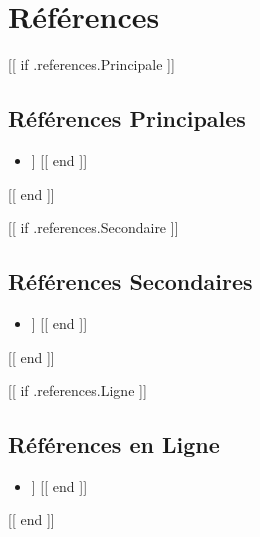 \section{Références}

[[ if .references.Principale ]]
\subsection{Références Principales}
\begin{itemize}
[[ range .references.Principale ]]
    \item [[ . ]]
[[ end ]]
\end{itemize}
[[ end ]]

[[ if .references.Secondaire ]]
\subsection{Références Secondaires}
\begin{itemize}
[[ range .references.Secondaire ]]
    \item [[ . ]]
[[ end ]]
\end{itemize}
[[ end ]]

[[ if .references.Ligne ]]
\subsection{Références en Ligne}
\begin{itemize}
[[ range .references.Ligne ]]
    \item [[ . ]]
[[ end ]]
\end{itemize}
[[ end ]]
